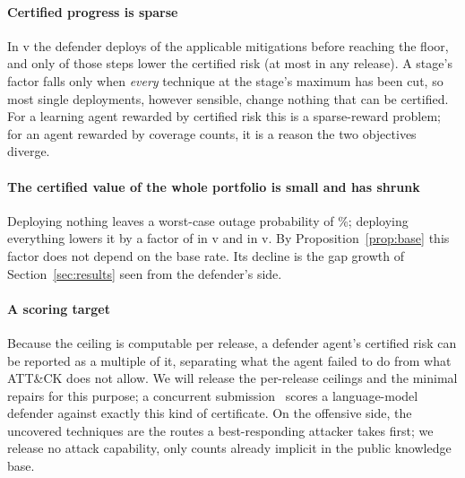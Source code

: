 \documentclass[conference,compsoc]{IEEEtran}
\begin{document}
\paragraph{Certified progress is sparse} In v\GapLastVersion{} the defender deploys
\GreedySteps{} of the \GreedyCandidates{} applicable mitigations before reaching the
floor, and only \GreedyImproving{} of those steps lower the certified risk (at most
\GreedyImprovingMax{} in any release). A stage's factor falls only when \emph{every}
technique at the stage's maximum has been cut, so most single deployments, however
sensible, change nothing that can be certified. For a learning agent rewarded by
certified risk this is a sparse-reward problem; for an agent rewarded by coverage
counts, it is a reason the two objectives diverge.

\paragraph{The certified value of the whole portfolio is small and has shrunk}
Deploying nothing leaves a worst-case outage probability of \GreedyEmpty\%; deploying
everything lowers it by a factor of \GreedyGainFirst{} in v\GapFirstVersion{} and
\GreedyGainLast{} in v\GapLastVersion. By Proposition~\ref{prop:base} this factor does
not depend on the base rate. Its decline is the gap growth of
Section~\ref{sec:results} seen from the defender's side.

\paragraph{A scoring target} Because the ceiling is computable per release, a defender
agent's certified risk can be reported as a multiple of it, separating what the agent
failed to do from what ATT\&CK does not allow. We will release the per-release ceilings and
the minimal repairs for this purpose; a concurrent submission~\cite{anon2026range} scores
a language-model defender against exactly this kind of certificate. On the offensive side, the uncovered techniques
are the routes a best-responding attacker takes first; we release no attack capability,
only counts already implicit in the public knowledge base.

\FloatBarrier
\end{document}
